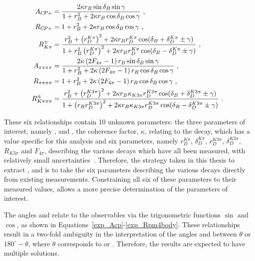 \begin{align}
A_{{C\!P}+} &= \frac{2 \kappa r_B\sin\delta_B\sin\gamma}{1 + r_B^2 + 2 \kappa r_B\cos\delta_B\cos\gamma} \text{ ,}
\label{exp_Acp} \\
R_{{C\!P}+} &= 1 + r_B^2 + 2 \kappa r_B\cos\delta_B\cos\gamma \text{ ,}
\label{exp_Rcp} \\
R^{\pm}_{K\pi} &= \frac{r_B^2 + \left(r_D^{K\pi}\right)^2 + 2\kappa r_B r_D^{K\pi} \cos(\delta_B + \delta_D^{K\pi} \pm \gamma)}{1 + r_B^2\left(r_D^{K\pi}\right)^2 + 2\kappa r_B r_D^{K\pi} \cos(\delta_B - \delta_D^{K\pi} \pm \gamma)} \text{ ,}
\label{exp_Rpm} \\
A_{\pi\pi\pi\pi} &= \frac{2 \kappa\left(2F_{4\pi} - 1\right) r_B\sin\delta_B\sin\gamma}{1 + r_B^2 + 2 \kappa\left(2F_{4\pi} - 1\right) r_B\cos\delta_B\cos\gamma} \text{ ,}
\label{exp_A4pi} \\
R_{\pi\pi\pi\pi} &= 1 + r_B^2 + 2 \kappa\left(2F_{4\pi} - 1\right) r_B\cos\delta_B\cos\gamma \text{ ,}
\label{exp_R4pi} \\
R^{\pm}_{K\pi\pi\pi} &= \frac{r_B^2 + \left(r_D^{K3\pi}\right)^2 + 2\kappa r_B \kappa_{K3\pi} r_D^{K3\pi} \cos(\delta_B + \delta_D^{K3\pi} \pm \gamma)}{1 + \left(r_Br_D^{K3\pi}\right)^2 + 2\kappa r_B \kappa_{K3\pi} r_D^{K3\pi} \cos(\delta_B - \delta_D^{K3\pi} \pm \gamma)} \text{ .}
\label{exp_Rpm4body} \\
\end{align}

These six relationships contain 10 unknown parameters: the three parameters of interest, namely \rb, \deltab and \Pgamma, the coherence factor, $\kappa$, relating to the \Bm decay, which has a value specific for this analysis and six parameters, namely $r_D^{K\pi}$, $\delta_D^{K\pi}$, $r_D^{K3\pi}$, $\delta_D^{K3\pi}$, $R_{K3\pi}$ and $F_{4\pi}$, describing the various \Dz decays which have all been measured, with relatively small uncertainties~\cite{charm4pi,charmk3pi,charmk3pi_errata,LHCb-PAPER-2015-057}. Therefore, the strategy taken in this thesis to extract \rb, \deltab and \Pgamma is to take the six parameters describing the various \Dz decays directly from existing measurements. Constraining all six of these parameters to their measured values, allows a more precise determination of the parameters of interest.

The angles \rb and \Pgamma relate to the \CP observables via the trigonometric functions $\sin$ and $\cos$, as shown in Equations~\ref{exp_Acp}-\ref{exp_Rpm4body}. These relationships result in a two-fold ambiguity in the interpretation of the angles \rb and \Pgamma between $\theta$ or $180^{\circ} - \theta$, where $\theta$ corresponds to \rb or \Pgamma. Therefore, the results are expected to have multiple solutions.


